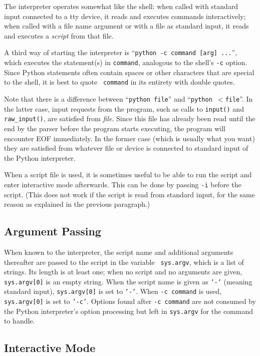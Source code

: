 The interpreter operates somewhat like the {\UNIX} shell: when called
with standard input connected to a tty device, it reads and executes
commands interactively; when called with a file name argument or with
a file as standard input, it reads and executes a {\em script} from
that file.

A third way of starting the interpreter is
``{\tt python -c command [arg] ...}'', which
executes the statement(s) in {\tt command}, analogous to the shell's
{\tt -c} option.  Since Python statements often contain spaces or other
characters that are special to the shell, it is best to quote {\tt
command} in its entirety with double quotes.

Note that there is a difference between ``{\tt python file}'' and
``{\tt python $<$file}''.  In the latter case, input requests from the
program, such as calls to {\tt input()} and {\tt raw_input()}, are
satisfied from {\em file}.  Since this file has already been read
until the end by the parser before the program starts executing, the
program will encounter EOF immediately.  In the former case (which is
usually what you want) they are satisfied from whatever file or device
is connected to standard input of the Python interpreter.

When a script file is used, it is sometimes useful to be able to run
the script and enter interactive mode afterwards.  This can be done by
passing {\tt -i} before the script.  (This does not work if the script
is read from standard input, for the same reason as explained in the
previous paragraph.)

\subsection{Argument Passing}

When known to the interpreter, the script name and additional
arguments thereafter are passed to the script in the variable {\tt
sys.argv}, which is a list of strings.  Its length is at least one;
when no script and no arguments are given, {\tt sys.argv[0]} is an
empty string.  When the script name is given as {\tt '-'} (meaning
standard input), {\tt sys.argv[0]} is set to {\tt '-'}.  When {\tt -c
command} is used, {\tt sys.argv[0]} is set to {\tt '-c'}.  Options
found after {\tt -c command} are not consumed by the Python
interpreter's option processing but left in {\tt sys.argv} for the
command to handle.

\subsection{Interactive Mode}

